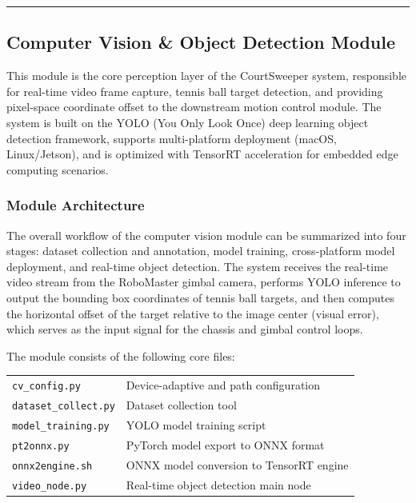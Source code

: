\label{sec:detailed_software}

\textcolor{gray}{\rule{\linewidth}{3pt}}


\subsection{Computer Vision \& Object Detection Module}
\label{sec:cv}

This module is the core perception layer of the CourtSweeper system, responsible for real-time video frame capture, tennis ball target detection, and providing pixel-space coordinate offset to the downstream motion control module. The system is built on the YOLO (You Only Look Once) deep learning object detection framework, supports multi-platform deployment (macOS, Linux/Jetson), and is optimized with TensorRT acceleration for embedded edge computing scenarios.

\subsubsection{Module Architecture}
\label{sec:cv:arch}

The overall workflow of the computer vision module can be summarized into four stages: dataset collection and annotation, model training, cross-platform model deployment, and real-time object detection. The system receives the real-time video stream from the RoboMaster gimbal camera, performs YOLO inference to output the bounding box coordinates of tennis ball targets, and then computes the horizontal offset of the target relative to the image center (visual error), which serves as the input signal for the chassis and gimbal control loops.

The module consists of the following core files:

\begin{tabularx}{0.8\linewidth}{lX}
  \texttt{cv\_config.py} & Device-adaptive and path configuration \\
  \texttt{dataset\_collect.py} & Dataset collection tool \\
  \texttt{model\_training.py} & YOLO model training script \\
  \texttt{pt2onnx.py} & PyTorch model export to ONNX format \\
  \texttt{onnx2engine.sh} & ONNX model conversion to TensorRT engine \\
  \texttt{video\_node.py} & Real-time object detection main node
\end{tabularx}

